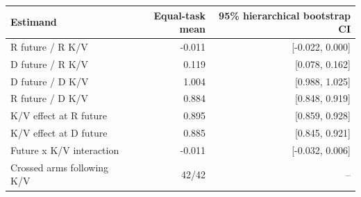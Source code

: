 \begin{tabular}{lrr}
\toprule
Estimand & Equal-task mean & 95\% hierarchical bootstrap CI \\
\midrule
R future / R K/V & -0.011 & [-0.022, 0.000] \\
D future / R K/V & 0.119 & [0.078, 0.162] \\
D future / D K/V & 1.004 & [0.988, 1.025] \\
R future / D K/V & 0.884 & [0.848, 0.919] \\
K/V effect at R future & 0.895 & [0.859, 0.928] \\
K/V effect at D future & 0.885 & [0.845, 0.921] \\
Future x K/V interaction & -0.011 & [-0.032, 0.006] \\
\midrule
Crossed arms following K/V & 42/42 & -- \\
\bottomrule
\end{tabular}
